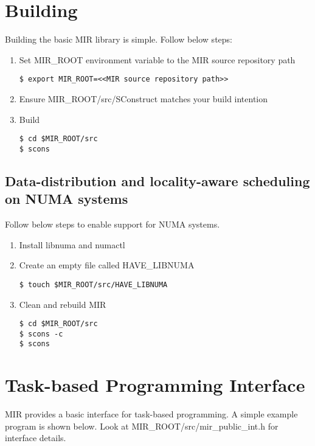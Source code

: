 \documentclass[11pt,a4paper,notitlepage]{article}
\begin{document}
\section{Building}
Building the basic MIR library is simple. Follow below steps:
\begin{enumerate}
\item Set MIR\_ROOT environment variable to the MIR source repository path
\begin{lstlisting}[style=BashInputStyle]
$ export MIR_ROOT=<<MIR source repository path>>
\end{lstlisting}
\item Ensure MIR\_ROOT/src/SConstruct matches your build intention
\item Build
\begin{lstlisting}[style=BashInputStyle]
$ cd $MIR_ROOT/src
$ scons 
\end{lstlisting}
\end{enumerate}

\subsection{Data-distribution and locality-aware scheduling on NUMA systems}
Follow below steps to enable support for NUMA systems.
\begin{enumerate}
\item Install libnuma and numactl
\item Create an empty file called HAVE\_LIBNUMA
\begin{lstlisting}[style=BashInputStyle]
$ touch $MIR_ROOT/src/HAVE_LIBNUMA
\end{lstlisting}
\item Clean and rebuild MIR
\begin{lstlisting}[style=BashInputStyle]
$ cd $MIR_ROOT/src
$ scons -c
$ scons 
\end{lstlisting}
\end{enumerate}

\section{Task-based Programming Interface}
MIR provides a basic interface for task-based programming. A simple example program is shown below. Look at MIR\_ROOT/src/mir\_public\_int.h for interface details.
\end{document}
